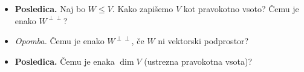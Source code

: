 \begin{enumerate}
\begin{itemize}
\begin{itemize}
            (2) Razvijemo vektor $z \in V_1^\perp$ po bazi z uporabo leme.
        \end{itemize}
        \item \colorbox{orange!30}{\textbf{Posledica.}} Naj bo $W \leq V$. Kako zapišemo $V$ kot pravokotno vsoto? Čemu je enako $W^{\perp \perp}$?
        \item \colorbox{yellow!30}{\emph{Opomba.}} Čemu je enako $W^{\perp \perp}$, če $W$ ni vektorski podprostor?
        \item \colorbox{orange!30}{\textbf{Posledica.}} Čemu je enaka $\dim V$ (ustrezna pravokotna vsota)?
    \end{itemize}
\end{enumerate}